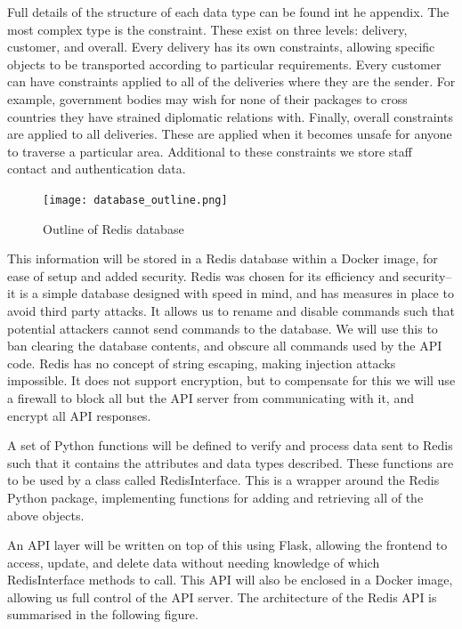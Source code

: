 Full details of the structure of each data type can be found int he appendix. The most complex type is the constraint. These exist on three levels: delivery, customer, and overall. Every delivery has its own constraints, allowing specific objects to be transported according to particular requirements. Every customer can have constraints applied to all of the deliveries where they are the sender. For example, government bodies may wish for none of their packages to cross countries they have strained diplomatic relations with. Finally, overall constraints are applied to all deliveries. These are applied when it becomes unsafe for anyone to traverse a particular area. Additional to these constraints we store staff contact and authentication data.

\begin{figure}[h]
\texttt{[image: database\_outline.png]}
    \centering
    \caption{Outline of Redis database}
    \label{fig:redis_database}
\end{figure}

This information will be stored in a Redis database within a Docker image, for ease of setup and added security. Redis was chosen for its efficiency and security-- it is a simple database designed with speed in mind, and has measures in place to avoid third party attacks\cite{redisSecutiry}. It allows us to rename and disable commands such that potential attackers cannot send commands to the database. We will use this to ban clearing the database contents, and obscure all commands used by the API code. Redis has no concept of string escaping, making injection attacks impossible. It does not support encryption, but to compensate for this we will use a firewall to block all but the API server from communicating with it, and encrypt all API responses.

A set of Python functions will be defined to verify and process data sent to Redis such that it contains the attributes and data types described. These functions are to be used by a class called RedisInterface. This is a wrapper around the Redis Python package, implementing functions for adding and retrieving all of the above objects.

An API layer will be written on top of this using Flask, allowing the frontend to access, update, and delete data without needing knowledge of which RedisInterface methods to call. This API will also be enclosed in a Docker image, allowing us full control of the API server. The architecture of the Redis API is summarised in the following figure.

